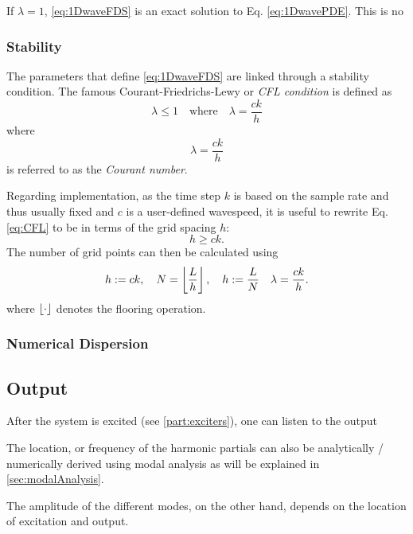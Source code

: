 If $\lambda = 1$, \eqref{eq:1DwaveFDS} is an exact solution to Eq. \eqref{eq:1DwavePDE}. This is no

\subsubsection{Stability}
The parameters that define \eqref{eq:1DwaveFDS} are linked through a stability condition. The famous Courant-Friedrichs-Lewy or \textit{CFL condition} is defined as \cite{courant} 
\begin{equation}\label{eq:CFL}
    \lambda \leq 1 \quad \text{where} \quad \lambda = \frac{ck}{h}
\end{equation}
where
\begin{equation}\label{eq:courantNumber}
    \lambda = \frac{ck}{h}
\end{equation}
is referred to as the \textit{Courant number}.

Regarding implementation, as the time step $k$ is based on the sample rate and thus usually fixed and $c$ is a user-defined wavespeed, it is useful to rewrite Eq. \eqref{eq:CFL} to be in terms of the grid spacing $h$:
\begin{equation}
    h \geq ck.
\end{equation}
The number of grid points can then be calculated using 
\begin{equation}
    h := ck, \quad N = \floor[\frac{L}{h}], \quad h := \frac{L}{N} \quad \lambda = \frac{ck}{h}.
\end{equation}
where $\floor[\cdot]$ denotes the flooring operation. 


\subsubsection{Numerical Dispersion}


\subsection{Output}
After the system is excited (see \ref{part:exciters}), one can listen to the output

The location, or frequency of the harmonic partials can also be analytically / numerically derived using modal analysis as will be explained in \ref{sec:modalAnalysis}.

The amplitude of the different modes, on the other hand, depends on the location of excitation and output. 
